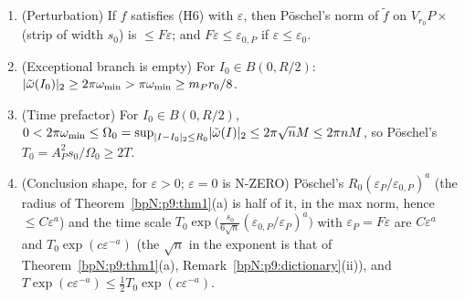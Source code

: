 \begin{lemma}
\begin{enumerate}[label=(\alph*)]
\item (Perturbation) If $f$ satisfies (H6) with $\varepsilon$, then P\"oschel's norm of $\tilde f$ on $V_{r_0}P\times$(strip of width $s_0$) is $\le F\varepsilon$; and $F\varepsilon\le\varepsilon_{0,P}$ if $\varepsilon\le\varepsilon_0$.
\item (Exceptional branch is empty) For $I_0\in B(0,R/2)$: $\lvert \tilde\omega(I_0)\rvert_2\ge2\pi\omega_{\min}>\pi\omega_{\min}\ge m_Pr_0/8$.
\item (Time prefactor) For $I_0\in B(0,R/2)$, $0<2\pi\omega_{\min}\le\Omega_0=\sup_{\lvert I-I_0\rvert_2\le R_0}\lvert \tilde\omega(I)\rvert_2\le2\pi\sqrt nM\le2\pi nM$, so P\"oschel's $T_0=A_P^2s_0/\Omega_0\ge2T$.
\item (Conclusion shape, for $\varepsilon>0$; $\varepsilon=0$ is N-ZERO) P\"oschel's $R_0(\varepsilon_P/\varepsilon_{0,P})^a$ (the radius of Theorem~\ref{bpN:p9:thm1}(a) is half of it, in the max norm, hence $\le C\varepsilon^a$) and the time scale $T_0\exp\bigl(\frac{s_0}{6\sqrt n}(\varepsilon_{0,P}/\varepsilon_P)^a\bigr)$ with $\varepsilon_P=F\varepsilon$ are $C\varepsilon^a$ and $T_0\exp(c\varepsilon^{-a})$ (the $\sqrt n$ in the exponent is that of Theorem~\ref{bpN:p9:thm1}(a), Remark~\ref{bpN:p9:dictionary}(ii)), and $T\exp(c\varepsilon^{-a})\le\tfrac12T_0\exp(c\varepsilon^{-a})$.
\end{enumerate}
\end{lemma}
